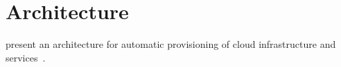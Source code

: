 \section{Architecture}
\label{related:architecture}

\citeauthor{provisioning:architecture} present an architecture for automatic provisioning of cloud infrastructure and services~\autocite{provisioning:architecture}.
